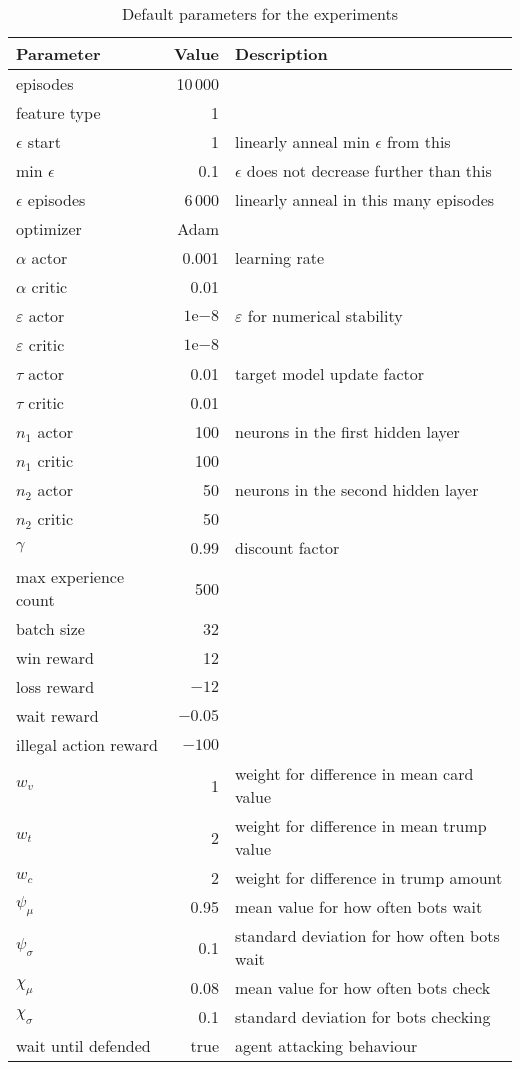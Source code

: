 \documentclass[a4paper,titlepage]{article}
\newcommand{\expn}[2]{{#1}\mathrm{e}{#2}}
\begin{document}
\begin{table}[h]
\centering
  \begin{tabular}{lrl}
    \toprule
    Parameter & Value & Description \\
    \midrule
    episodes & 10\,000 \\
    feature type & 1 \\
    $\epsilon$ start & 1 & linearly anneal min $\epsilon$ from this\\
    min $\epsilon$ & 0.1 & $\epsilon$ does not decrease further than this \\
    $\epsilon$ episodes & 6\,000 & linearly anneal in this many episodes \\
    optimizer & Adam \\
    $\alpha$ actor & 0.001 & learning rate \\
    $\alpha$ critic & 0.01 \\
    $\varepsilon$ actor & $\expn{1}{-8}$ & $\varepsilon$ for numerical stability \\
    $\varepsilon$ critic & $\expn{1}{-8}$ \\
    $\tau$ actor & 0.01 & target model update factor \\
    $\tau$ critic & 0.01 \\
    $n_1$ actor & 100 & neurons in the first hidden layer \\
    $n_1$ critic & 100 \\
    $n_2$ actor & 50 & neurons in the second hidden layer \\
    $n_2$ critic & 50 \\
    $\gamma$ & 0.99 & discount factor \\
    max experience count & 500 \\
    batch size & 32 \\
    win reward & 12 \\
    loss reward & ${-12}$ \\
    wait reward & $-0.05$ \\
    illegal action reward & $-100$ \\
    $w_v$ & 1 & weight for difference in mean card value \\
    $w_t$ & 2 & weight for difference in mean trump value \\
    $w_c$ & 2 & weight for difference in trump amount \\
    $\psi_\mu$ & 0.95 & mean value for how often bots wait \\
    $\psi_\sigma$ & 0.1 & standard deviation for how often bots wait \\
    $\chi_\mu$ & 0.08 & mean value for how often bots check \\
    $\chi_\sigma$ & 0.1 & standard deviation for bots checking \\
    wait until defended & true & agent attacking behaviour \\
    \bottomrule
  \end{tabular}
  \caption{Default parameters for the experiments}
  \label{table:parameters}
\end{table}
\end{document}
